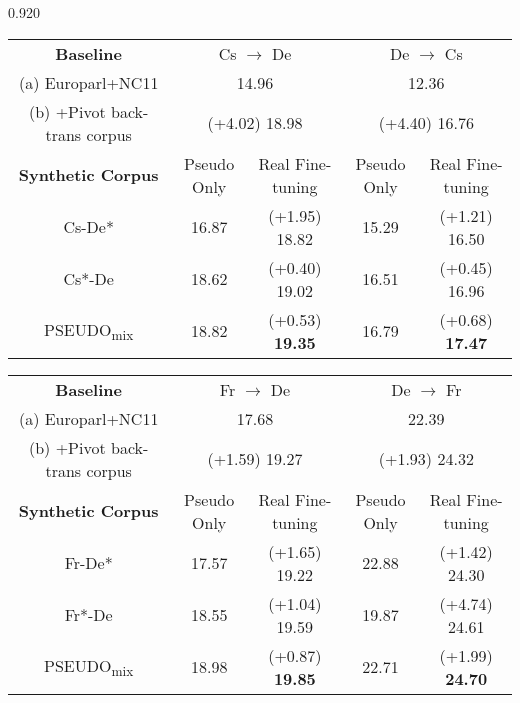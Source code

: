 \documentclass[11pt,letterpaper]{article}
\newcommand{\mylinespacing}{0.920}
\begin{document}
\begin{spacing}{\mylinespacing}
\begin{table*}[t]
\centering
	\begin{subtable}[t]{\columnwidth}
		\centering
		\begin{tabular}{c||cc||cc}
        		\hline
                \textbf{Baseline} & \multicolumn{2}{c||}{Cs \(\rightarrow\) De} & \multicolumn{2}{c}{De \(\rightarrow\) Cs} \\
				(a) Europarl+NC11 & \multicolumn{2}{c||}{14.96} & \multicolumn{2}{c}{12.36} \\ 
                (b) +Pivot back-trans corpus & \multicolumn{2}{c||}{{\scriptsize(+4.02)} 18.98} & \multicolumn{2}{c}{{\scriptsize(+4.40)} 16.76} \\ \hline\hline
				\textbf{Synthetic Corpus} & Pseudo Only & Real Fine-tuning & Pseudo Only & Real Fine-tuning \\
                Cs-De* & 16.87 & {\scriptsize(+1.95)} 18.82 & 15.29 & {\scriptsize(+1.21)} 16.50 \\
                Cs*-De & 18.62 & {\scriptsize(+0.40)} 19.02 & 16.51 & {\scriptsize(+0.45)} 16.96 \\
                PSEUDO\textsubscript{mix} & 18.82 & {\scriptsize(+0.53)} \textbf{19.35} & 16.79 & {\scriptsize(+0.68)} \textbf{17.47} \\
            \hline
		\end{tabular}
		\label{tab:real_finetuning_csde}
        \caption{Cs \(\leftrightarrow\) De}
	\end{subtable}%
	\qquad
    \begin{subtable}[t]{\columnwidth}
		\centering
		\begin{tabular}{c||cc||cc}
        		\hline
                \textbf{Baseline} & \multicolumn{2}{c||}{Fr \(\rightarrow\) De} & \multicolumn{2}{c}{De \(\rightarrow\) Fr} \\
				(a) Europarl+NC11 & \multicolumn{2}{c||}{17.68} & \multicolumn{2}{c}{22.39} \\ 
                (b) +Pivot back-trans corpus & \multicolumn{2}{c||}{{\scriptsize(+1.59)} 19.27} & \multicolumn{2}{c}{{\scriptsize(+1.93)} 24.32} \\ \hline\hline
				\textbf{Synthetic Corpus} & Pseudo Only & Real Fine-tuning & Pseudo Only & Real Fine-tuning \\
                Fr-De* & 17.57 & {\scriptsize(+1.65)} 19.22 & 22.88 & {\scriptsize(+1.42)} 24.30 \\
                Fr*-De & 18.55 & {\scriptsize(+1.04)} 19.59 & 19.87 & {\scriptsize(+4.74)} 24.61 \\
                PSEUDO\textsubscript{mix} & 18.98 & {\scriptsize(+0.87)} \textbf{19.85} & 22.71 & {\scriptsize(+1.99)} \textbf{24.70} \\
            \hline
		\end{tabular}
		\label{tab:real_finetuning_frde}
        \caption{Fr \(\leftrightarrow\) De}
	\end{subtable}
    

\end{table*}
\end{spacing}
\end{document}
